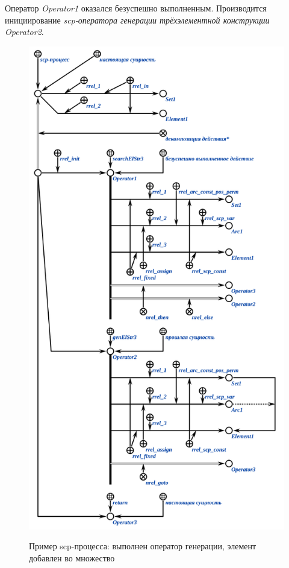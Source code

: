 Оператор \textit{Operator1} оказался безуспешно выполненным. Производится инициирование \textit{\mbox{scp-оператора} генерации трёхэлементной конструкции} ~~~ \textit{Operator2}.

\begin{figure}[H]
	\centering
	\caption{Пример scp-процесса: выполнен оператор генерации, элемент добавлен во множество}
	\includegraphics[scale=0.8]{images/part3/chapter_situation_management/process_example3.png}
	\label{fig:process_example3}
\end{figure}

